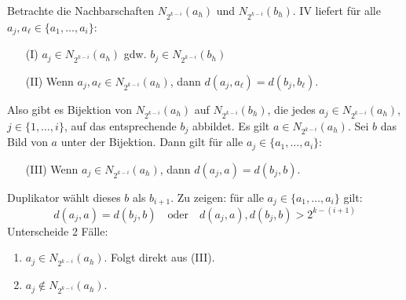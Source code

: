 \documentclass[fontsize=11pt, twoside=false, numbers=autoenddot]{scrbook}
\begin{document}
\begin{beweis}
\begin{description}
\begin{enumerate}
          Betrachte die Nachbarschaften $N_{2^{k-i}}(a_h)$ und
          $N_{2^{k-i}}(b_h)$. 
          IV liefert 
          f\"ur alle $a_j,a_\ell \in \{ a_1,\dots,a_i \}$:
          \begin{enumerate}
            \item[(I)]
              $a_j \in N_{2^{k-i}}(a_h)$ gdw.  $b_j \in N_{2^{k-i}}(b_h)$
            \item[(II)]
              Wenn $a_j,a_\ell \in N_{2^{k-i}}(a_h)$, dann $d(a_j,a_\ell)=d(b_j,b_\ell)$.
          \end{enumerate}
          Also gibt es Bijektion von $N_{2^{k-i}}(a_h)$ auf
          $N_{2^{k-i}}(b_h)$, die jedes $a_j \in N_{2^{k-i}}(a_h)$, $j \in
          \{1,\dots,i\}$, auf das entsprechende $b_j$ abbildet. Es gilt $a \in
          N_{2^{k-i}}(a_h)$.  Sei $b$ das Bild von $a$ unter der
          Bijektion. Dann gilt f\"ur alle $a_j \in \{a_1,\dots,a_i\}$:
          \begin{enumerate}
            \item[(III)]
              Wenn $a_j \in N_{2^{k-i}}(a_h)$, dann $d(a_j,a)=d(b_j,b)$.
          \end{enumerate}
          Duplikator w\"ahlt dieses $b$ als $b_{i+1}$. Zu zeigen: f\"ur alle $a_j \in \{a_1,\dots, a_i\}$ gilt: 
          \[
            d(a_j,a)=d(b_j,b)
            \quad\text{oder}\quad
            d(a_j,a),d(b_j,b) > 2^{k-(i+1)}
          \]
          Unterscheide 2 F\"alle:
          \begin{enumerate}
            \item
              $a_j \in N_{2^{k-i}}(a_h)$. Folgt direkt aus (III).
          \item
            $a_j \notin N_{2^{k-i}}(a_h)$.



\end{enumerate}
\end{enumerate}
\end{description}
\end{beweis}
\end{document}
